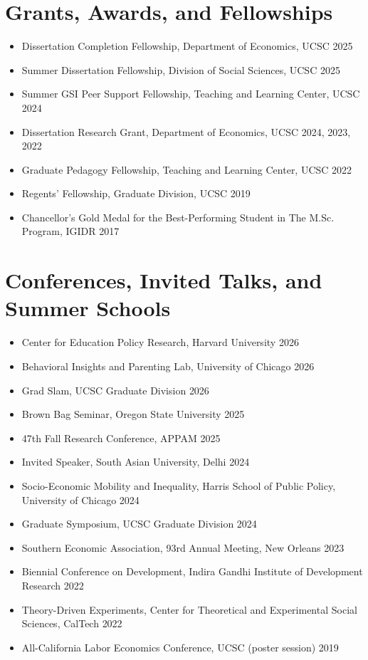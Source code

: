 \documentclass[letter,11pt]{article}
\newcommand{\dateright}[1]{\hfill{\small #1}}
\begin{document}
\section{Grants, Awards, and Fellowships}
\begin{itemize}
    \item[] Dissertation Completion Fellowship, Department of Economics, UCSC \dateright{2025}
    \item[] Summer Dissertation Fellowship, Division of Social Sciences, UCSC \dateright{2025}
    \item[] Summer GSI Peer Support Fellowship, Teaching and Learning Center, UCSC \dateright{2024}
    \item[] Dissertation Research Grant, Department of Economics, UCSC \dateright{2024, 2023, 2022}
    \item[] Graduate Pedagogy Fellowship, Teaching and Learning Center, UCSC \dateright{2022}
    \item[] Regents' Fellowship, Graduate Division, UCSC \dateright{2019}
    \item[] Chancellor's Gold Medal for the Best-Performing Student in The M.Sc. Program, IGIDR \dateright{2017}
\end{itemize}

\section{Conferences, Invited Talks, and Summer Schools}
\begin{itemize}
  \item[] Center for Education Policy Research, Harvard University \dateright{2026}
  \item[] Behavioral Insights and Parenting Lab, University of Chicago \dateright{2026}
  \item[] Grad Slam, UCSC Graduate Division \dateright{2026}
  \item[] Brown Bag Seminar, Oregon State University \dateright{2025}
  \item[] 47th Fall Research Conference, APPAM  \dateright{2025}
  \item[] Invited Speaker, South Asian University, Delhi \dateright{2024}
  \item[] Socio-Economic Mobility and Inequality, Harris School of Public Policy, University of Chicago \dateright{2024}
  \item[] Graduate Symposium, UCSC Graduate Division \dateright{2024} 
  \item[] Southern Economic Association, 93rd Annual Meeting, New Orleans \dateright{2023}
  \item[] Biennial Conference on Development, Indira Gandhi Institute of Development Research \dateright{2022}
\item[] Theory-Driven Experiments, Center for Theoretical and Experimental Social Sciences, CalTech \dateright{2022}
\item[] All-California Labor Economics Conference, UCSC (poster session) \dateright{2019}
\end{itemize}
\end{document}
